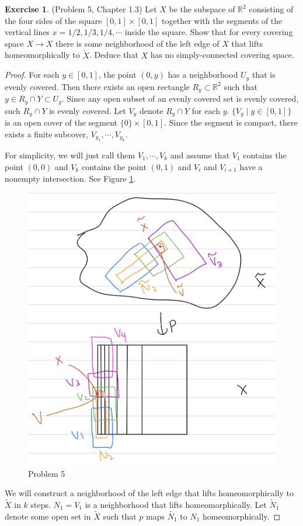 \documentclass[12pt, psamsfonts]{amsart}
\theoremstyle{definition}
\newtheorem*{exer}{Exercise}
\theoremstyle{remark}
\numberwithin{equation}{section}
\begin{document}
\begin{exer}{(Problem 5, Chapter 1.3)}
  Let $X$ be the subspace of $\mathbb{R}^2$ consisting of the four sides of the square $[0, 1] \times [0, 1]$ together with the segments of the vertical lines $x = 1/2, 1/3, 1/4, \cdots$ inside the square.
  Show that for every covering space $X \rightarrow X$ there is some neighborhood of the left edge of $X$ that lifts homeomorphically to $\tilde{X}$.
  Deduce that $X$ has no simply-connected covering space.
\end{exer}

\begin{proof}
  For each $y \in [0, 1]$, the point $(0, y)$ has a neighborhood $U_y$ that is evenly covered.
  Then there exists an open rectangle $R_y \subset \mathbb{R}^2$ such that $y \in R_y \cap Y \subset U_y$.
  Since any open subset of an evenly covered set is evenly covered, such $R_y \cap Y$ is evenly covered.
  Let $V_y$ denote $R_y \cap Y$ for each $y$.
  $\{ V_y  \mid y \in [0, 1] \}$ is an open cover of the segment $\{ 0 \} \times [0, 1]$.
  Since the segment is compact, there exists a finite subcover, $V_{y_1}, \cdots, V_{y_k}$.

  For simplicity, we will just call them $V_1, \cdots, V_k$ and assume that $V_1$ contains the point $(0, 0)$ and $V_k$ contains the point $(0, 1)$ and $V_i$ and $V_{i + 1}$ have a nonempty intersection.
  See Figure \ref{fig:problem5}.
  \begin{figure}
    \includegraphics[width=.5\linewidth]{problem5.jpeg}
    \caption{Problem 5}
    \label{fig:problem5}
  \end{figure}

  We will construct a neighborhood of the left edge that lifts homeomorphically to $\tilde{X}$ in $k$ steps.
  $N_1 = V_1$ is a neighborhood that lifts homeomorphically.
  Let $\tilde{N}_1$ denote some open set in $\tilde{X}$ such that $p$ maps $\tilde{N_1}$ to $N_1$ homeomorphically.


\end{proof}
\end{document}
